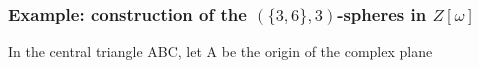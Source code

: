 \documentclass{beamer}
\begin{document}
\begin{frame}\frametitle{Example: construction of the $(\{3,6\},3)$-spheres in $Z[\omega]$}
\vspace{-3mm}
\begin{center} 
\begin{minipage}{3.9cm}
\par
In the central triangle ABC, let A be the origin of the complex plane
\end{minipage}
\begin{minipage}{3.9cm}
\par


\end{minipage}
\end{center}
\end{frame}
\end{document}
